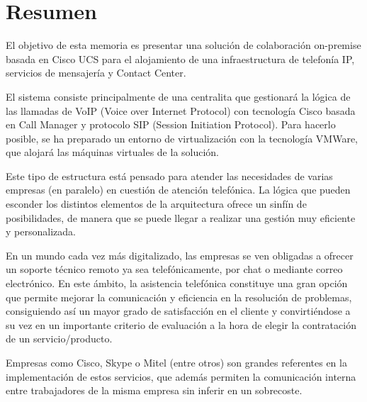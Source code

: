 \documentclass[a4paper, 12pt]{book}
\begin{document}

\chapter*{Resumen}

El objetivo de esta memoria es presentar una solución de colaboración on-premise basada en Cisco UCS para el alojamiento de una infraestructura de telefonía IP, servicios de mensajería y Contact Center.

El sistema consiste principalmente de una centralita que gestionará la lógica de las llamadas de VoIP (Voice over Internet Protocol) con tecnología Cisco basada en Call Manager y protocolo SIP (Session Initiation Protocol).
Para hacerlo posible, se ha preparado un entorno de virtualización con la tecnología VMWare, que alojará las máquinas virtuales de la solución.

Este tipo de estructura está pensado para atender las necesidades de varias empresas (en paralelo) en cuestión de atención telefónica. La lógica que pueden esconder los distintos elementos de la arquitectura ofrece un sinfín de posibilidades, de manera que se puede llegar a realizar una gestión muy eficiente y personalizada.

En un mundo cada vez más digitalizado, las empresas se ven obligadas a ofrecer un soporte técnico remoto ya sea telefónicamente, por chat o mediante correo electrónico. En este ámbito, la asistencia telefónica constituye una gran opción que permite mejorar la comunicación y eficiencia en la resolución de problemas, consiguiendo así un mayor grado de satisfacción en el cliente y convirtiéndose a su vez en un importante criterio de evaluación a la hora de elegir la contratación de un servicio/producto.

Empresas como Cisco, Skype o Mitel (entre otros) son grandes referentes en la implementación de estos servicios, que además permiten la comunicación interna entre trabajadores de la misma empresa sin inferir en un sobrecoste.
\end{document}

